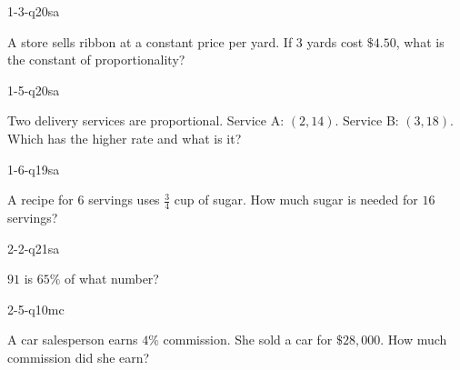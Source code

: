 
\begin{practiceQuestion}{1-3-q20}{sa}
\begin{questionText}
A store sells ribbon at a constant price per yard. If $3$ yards cost $\$4.50$, what is the constant of proportionality?
\end{questionText}
\end{practiceQuestion}

\begin{practiceQuestion}{1-5-q20}{sa}
\begin{questionText}
Two delivery services are proportional. Service A: $(2, 14)$. Service B: $(3, 18)$. Which has the higher rate and what is it?
\end{questionText}
\end{practiceQuestion}

\begin{practiceQuestion}{1-6-q19}{sa}
\begin{questionText}
A recipe for $6$ servings uses $\frac{3}{4}$ cup of sugar. How much sugar is needed for $16$ servings?
\end{questionText}
\end{practiceQuestion}

\begin{practiceQuestion}{2-2-q21}{sa}
\begin{questionText}
$91$ is $65\%$ of what number?
\end{questionText}
\end{practiceQuestion}

\begin{practiceQuestion}{2-5-q10}{mc}
\begin{questionText}
A car salesperson earns $4\%$ commission. She sold a car for $\$28{,}000$. How much commission did she earn?
\end{questionText}
\end{practiceQuestion}

